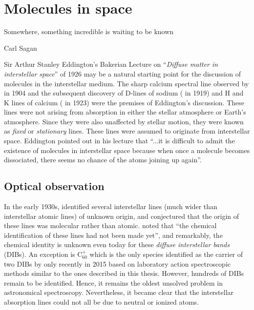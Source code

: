 \section{Molecules in space}
\label{sec:intro:ions_in_space}

\epigraph{Somewhere, something incredible is waiting to be known}{Carl Sagan}
Sir Arthur Stanley Eddington's Bakerian Lecture on \enquote{\emph{Diffuse matter in interstellar space}} \cite{eddington_bakerian_1926} of 1926 may be a natural starting point for the discussion of molecules in the interstellar medium. The sharp calcium spectral line observed by \citet{hartmann_investigations_1904} in 1904 and the subsequent discovery of D-lines of sodium (\citet{heger_occurrence_1919} in 1919) and H and K lines of calcium (\citet{plaskett_h_1923} in 1923) were the premises of Eddington's discussion. These lines were not arising from absorption in either the stellar atmosphere or Earth's atmosphere. Since they were also unaffected by stellar motion, they were known as \emph{fixed} or \emph{stationary} lines. These lines were assumed to originate from interstellar space. Eddington pointed out in his lecture that \enquote{...it is difficult to admit the existence of molecules in interstellar space because when once a molecule becomes dissociated, there seems no chance of the atoms joining up again}. 

\subsection{Optical observation}
\label{subsec:intro:optical}

In the early 1930s, \citet{merrill_unidentified_1934} identified several interstellar lines (much wider than interstellar atomic lines) of unknown origin, and \citet{russell_analysis_1935} conjectured that the origin of these lines was molecular rather than atomic. \citet{merrill_stationary_1936} noted that \enquote{the chemical identification of these lines had not been made yet}, and remarkably, the chemical identity is unknown even today for these \emph{diffuse interstellar bands} (DIBs). An exception is C$_{60}^+$ which is the only species identified as the carrier of two DIBs by \citet{campbell_laboratory_2015} only recently in 2015 based on laboratory action spectroscopic methods similar to the ones described in this thesis. However, hundreds of DIBs remain to be identified. Hence, it remains the oldest unsolved problem in astronomical spectroscopy. Nevertheless, it became clear that the interstellar absorption lines could not all be due to neutral or ionized atoms.

